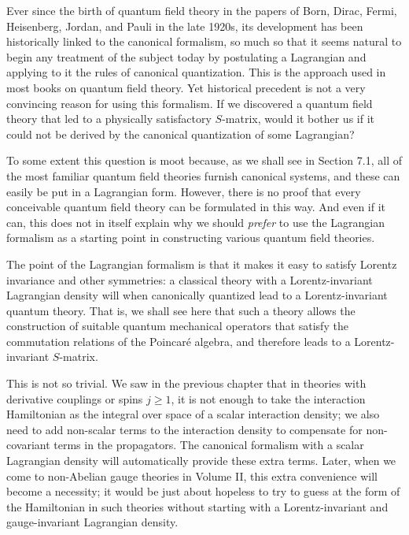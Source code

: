 
Ever since the birth of quantum field theory in the papers of Born, Dirac,
Fermi, Heisenberg, Jordan, and Pauli in the late 1920s, its development
has been historically linked to the canonical formalism, so much so that it
seems natural to begin any treatment of the subject today by postulating a
Lagrangian and applying to it the rules of canonical quantization. This is
the approach used in most books on quantum field theory. Yet historical
precedent is not a very convincing reason for using this formalism. If
we discovered a quantum field theory that led to a physically satisfactory
$S$-matrix, would it bother us if it could not be derived by the canonical
quantization of some Lagrangian?

To some extent this question is moot because, as we shall see in Section
7.1, all of the most familiar quantum field theories furnish canonical
systems, and these can easily be put in a Lagrangian form. However,
there is no proof that every conceivable quantum field theory can be
formulated in this way. And even if it can, this does not in itself explain
why we should \textit{prefer} to use the Lagrangian formalism as a starting point
in constructing various quantum field theories.

The point of the Lagrangian formalism is that it makes it easy to
satisfy Lorentz invariance and other symmetries: a classical theory with
a Lorentz-invariant Lagrangian density will when canonically quantized
lead to a Lorentz-invariant quantum theory. That is, we shall see here
that such a theory allows the construction of suitable quantum mechanical
operators that satisfy the commutation relations of the Poincar\'e algebra,
and therefore leads to a Lorentz-invariant $S$-matrix.

This is not so trivial. We saw in the previous chapter that in theories
with derivative couplings or spins $j\geq1$, it is not enough to take the
interaction Hamiltonian as the integral over space of a scalar interaction
density; we also need to add non-scalar terms to the interaction density
to compensate for non-covariant terms in the propagators. The canonical
formalism with a scalar Lagrangian density will automatically provide
these extra terms. Later, when we come to non-Abelian gauge theories
in Volume II, this extra convenience will become a necessity; it would be
just about hopeless to try to guess at the form of the Hamiltonian in such
theories without starting with a Lorentz-invariant and gauge-invariant
Lagrangian density.

